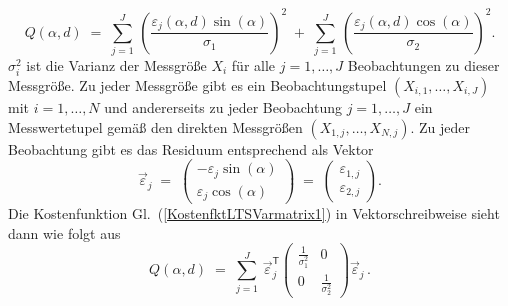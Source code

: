 \begin{equation}
Q(\alpha, d) \; = \;
\sum\limits_{j=1}^J \,  \left(\frac{\varepsilon_j(\alpha, d) \sin(\alpha)}{\sigma_1}\right)^2
\; + \; \sum\limits_{j=1}^J \, \left(\frac{\varepsilon_j(\alpha, d) \cos(\alpha)}{\sigma_2}\right)^2 .
\label{KostenfktLTSVarmatrix1}
\end{equation}
$\sigma_i^2$ ist die Varianz der Messgröße $X_i$ für alle $j=1,\dots,J$ Beobachtungen zu
dieser Messgröße. Zu jeder Messgröße gibt es ein Beobachtungstupel $(X_{i,1}, \dots, X_{i,J})$
mit $i = 1, \dots, N$ und andererseits zu jeder Beobachtung $j = 1, \dots, J$
ein Messwertetupel gemäß den direkten Messgrößen $(X_{1,j}, \dots, X_{N,j})$. Zu jeder
Beobachtung gibt es das Residuum entsprechend als Vektor
\begin{equation}
\vec \varepsilon_j \; = \;
\left(\begin{array}{c} -\varepsilon_j \sin(\alpha)\\
\varepsilon_j \cos(\alpha)
\end{array}\right)  \; = \;
\left(\begin{array}{c} \varepsilon_{1,j}\\
\varepsilon_{2,j}
\end{array}\right).
\end{equation}
Die Kostenfunktion Gl.~(\ref{KostenfktLTSVarmatrix1}) in Vektorschreibweise sieht dann wie folgt aus
\begin{equation}
Q(\alpha, d) \; = \;
\sum\limits_{j=1}^J \,
\vec \varepsilon_j^\mathsf{T} \left(
\begin{array}{cc}
\frac{1}{\sigma_1^2} & 0 \\
0 & \frac{1}{\sigma_2^2}
\end{array}\right) \vec \varepsilon_j \,
\label{KostenfktLTSVarmatrix2} .
\end{equation}

